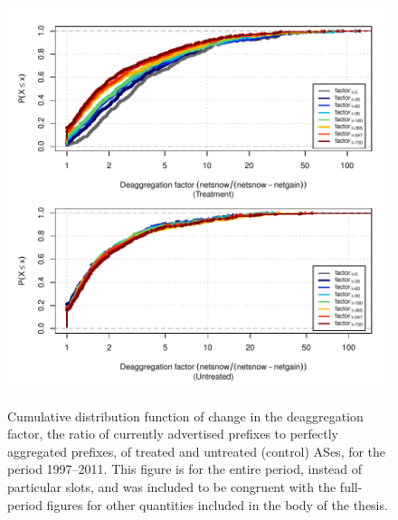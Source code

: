 \begin{figure}[H]
\begin{centering}
\begin{singlespace}
    \includegraphics[width=6in]
    {figures/behavior-deagg_factor-1997_2011-corr.pdf}
    \vspace{-2em}\\
    \caption{Cumulative distribution function of change in the deaggregation
    factor, the ratio of currently advertised prefixes to perfectly aggregated
    prefixes, of treated and untreated (control) ASes, for the period
    1997--2011. This figure is for the entire period, instead of particular
    slots, and was included to be congruent with the full-period figures for
    other quantities included in the body of the thesis.}
\end{singlespace}
\end{centering}
\end{figure}

